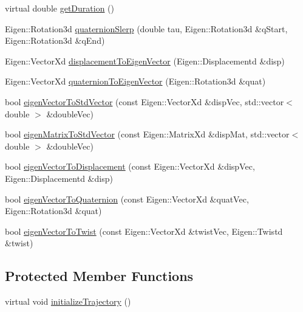 \begin{DoxyCompactItemize}
\item 
virtual double \hyperlink{classocra_1_1Trajectory_ad65e4ce63f33d79d7880742035a64d6c}{get\+Duration} ()
\item 
Eigen\+::\+Rotation3d \hyperlink{classocra_1_1Trajectory_ad431ef279bae49c96ee628a1d529e0e1}{quaternion\+Slerp} (double tau, Eigen\+::\+Rotation3d \&q\+Start, Eigen\+::\+Rotation3d \&q\+End)
\item 
Eigen\+::\+Vector\+Xd \hyperlink{classocra_1_1Trajectory_ae430040a9159317971ce66f4bd3a162a}{displacement\+To\+Eigen\+Vector} (Eigen\+::\+Displacementd \&disp)
\item 
Eigen\+::\+Vector\+Xd \hyperlink{classocra_1_1Trajectory_a8067d74e524a9cef9d5247adc966ed66}{quaternion\+To\+Eigen\+Vector} (Eigen\+::\+Rotation3d \&quat)
\item 
bool \hyperlink{classocra_1_1Trajectory_a64c08a544337e1a1a50f2bbdd73f2005}{eigen\+Vector\+To\+Std\+Vector} (const Eigen\+::\+Vector\+Xd \&disp\+Vec, std\+::vector$<$ double $>$ \&double\+Vec)
\item 
bool \hyperlink{classocra_1_1Trajectory_a2a659e10b5701c8cd50a53ab00e69023}{eigen\+Matrix\+To\+Std\+Vector} (const Eigen\+::\+Matrix\+Xd \&disp\+Mat, std\+::vector$<$ double $>$ \&double\+Vec)
\item 
bool \hyperlink{classocra_1_1Trajectory_ac8f9c3fdb888707304a817866f13c244}{eigen\+Vector\+To\+Displacement} (const Eigen\+::\+Vector\+Xd \&disp\+Vec, Eigen\+::\+Displacementd \&disp)
\item 
bool \hyperlink{classocra_1_1Trajectory_a943c143409f5f8c49ec4878e5d7b838b}{eigen\+Vector\+To\+Quaternion} (const Eigen\+::\+Vector\+Xd \&quat\+Vec, Eigen\+::\+Rotation3d \&quat)
\item 
bool \hyperlink{classocra_1_1Trajectory_a74c6fb6857f2f7fe24dcb666acff8571}{eigen\+Vector\+To\+Twist} (const Eigen\+::\+Vector\+Xd \&twist\+Vec, Eigen\+::\+Twistd \&twist)
\end{DoxyCompactItemize}
\subsection*{Protected Member Functions}
\begin{DoxyCompactItemize}
\item 
virtual void \hyperlink{classocra_1_1Trajectory_aa49b123abf79be71f131c138ff2a88b2}{initialize\+Trajectory} ()
\end{DoxyCompactItemize}

